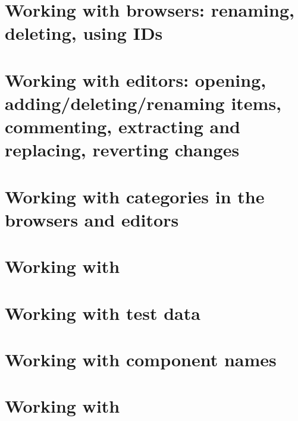 \clearpage
\section{Working with browsers: renaming, deleting, using IDs}
\label{WorkingWithBrowsers}


\section{Working with editors: opening, adding/deleting/renaming items, commenting, extracting and replacing, reverting changes}
\label{WorkingWithEditors}


\section{Working with categories in the browsers and editors}
\label{WorkingWithCategories}


\clearpage
\section{Working with \gdcases{}}
\label{WorkingWithTestCases}


\clearpage

\section{Working with test data}
\label{WorkingWithData}


\clearpage

\section{Working with component names}
\label{reass}



\clearpage

\section{Working with \gdsuites{}}
\label{WorkingWithSuites}


